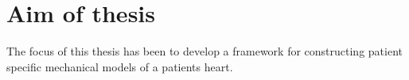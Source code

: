 \section{Aim of thesis}

The focus of this thesis has been to develop a framework for
constructing patient specific mechanical models of a patients heart. 



